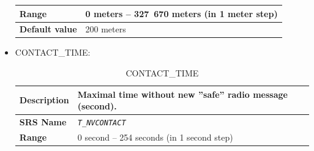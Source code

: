 \documentclass{template/openetcs}
\begin{document}
\begin{itemize}
\begin{longtable}{|l|l|}
				\hline
																																
					\begin{minipage}[t]{0.22\linewidth} \textbf{Range}	\end{minipage} 
				&	\begin{minipage}[t]{0.78\linewidth} 0 meters – 327 670 meters (in 1 meter step) \end{minipage} \\
								
				\hline
										
					\begin{minipage}[t]{0.22\linewidth} \textbf{Default value}	\end{minipage} 
				&	\begin{minipage}[t]{0.78\linewidth} 200 meters \end{minipage} \\
				
				\hline
				
			\end{longtable}
			
		\item CONTACT\_TIME:
		
			\begin{longtable}{|l|l|}
				\caption{CONTACT\_TIME}\\ 																										
				\hline
				
					\begin{minipage}[t]{0.22\linewidth} \textbf{Description}	\end{minipage} 
				&	\begin{minipage}[t]{0.78\linewidth} Maximal time without new ”safe” radio message (second). \end{minipage} \\
				
				\hline
				
					\begin{minipage}[t]{0.22\linewidth} \textbf{SRS Name}	\end{minipage} 
				&	\begin{minipage}[t]{0.78\linewidth} \emph{\texttt{T\_NVCONTACT}} \end{minipage} \\
				
				\hline
																																
					\begin{minipage}[t]{0.22\linewidth} \textbf{Range}	\end{minipage} 
				&	\begin{minipage}[t]{0.78\linewidth} 0 second – 254 seconds (in 1 second step) \end{minipage} \\
					

\end{longtable}
\end{itemize}
\end{document}
